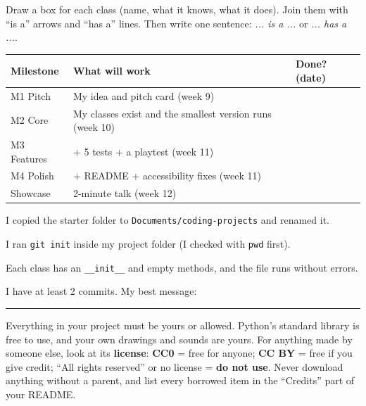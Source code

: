 \begin{exercise}
Draw a box for each class (name, what it knows, what it does). Join them with \enquote{is a} arrows and \enquote{has a} lines. Then write one sentence: \emph{... is a ...} or \emph{... has a ...}.
\answerspace{5.5cm}
\end{exercise}

\begin{exercise}
\begin{center}\small
\begin{tabular}{|p{2.6cm}|p{8.2cm}|p{2.8cm}|}
\hline
\textbf{Milestone} & \textbf{What will work} & \textbf{Done? (date)}\\ \hline
M1 Pitch & My idea and pitch card (week 9) & \\ \hline
M2 Core & My classes exist and the smallest version runs (week 10) & \\[0.6cm] \hline
M3 Features & + 5 tests + a playtest (week 11) & \\[0.6cm] \hline
M4 Polish & + README + accessibility fixes (week 11) & \\[0.6cm] \hline
Showcase & 2-minute talk (week 12) & \\ \hline
\end{tabular}
\end{center}
\end{exercise}

\begin{exercise}
\begin{checklist}
  \item I copied the starter folder to \texttt{Documents/coding-projects} and renamed it.
  \item I ran \texttt{git init} inside my project folder (I checked with \texttt{pwd} first).
  \item Each class has an \texttt{\_\_init\_\_} and empty methods, and the file runs without errors.
  \item I have at least 2 commits. My best message: \rule{6cm}{0.4pt}
\end{checklist}
\end{exercise}

\begin{safety}
Everything in your project must be yours or allowed. Python's standard library is free to use, and your own drawings and sounds are yours. For anything made by someone else, look at its \textbf{license}: \textbf{CC0} = free for anyone; \textbf{CC BY} = free if you give credit; \enquote{All rights reserved} or no license = \textbf{do not use}. Never download anything without a parent, and list every borrowed item in the \enquote{Credits} part of your README.
\end{safety}

